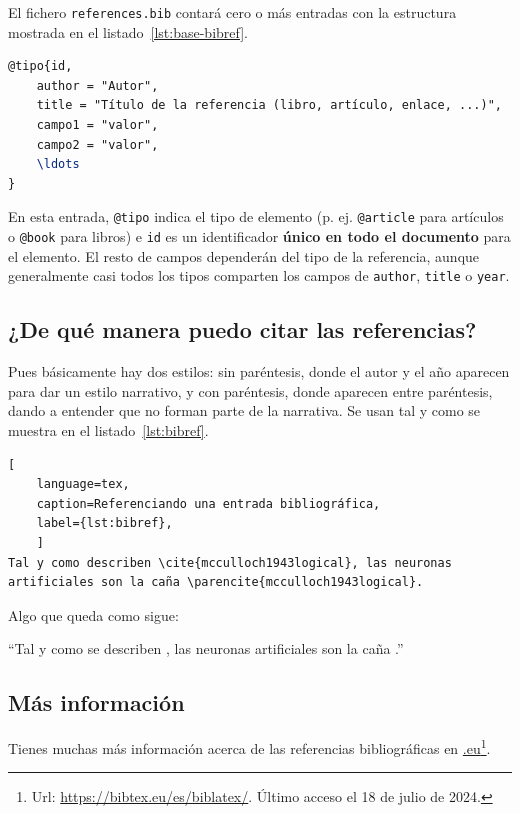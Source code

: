 \documentclass[%
    school=etsisi,%
    type=tfg,%
    degree=61CD,%
]{upm-report}
\begin{document}
El fichero \texttt{references.bib} contará cero o más entradas con la estructura mostrada en el listado~\ref{lst:base-bibref}.

\begin{lstlisting}[language=tex,caption=Estructura general de una referencia,label=lst:base-bibref]
@tipo{id,
    author = "Autor",
    title = "Título de la referencia (libro, artículo, enlace, ...)",
    campo1 = "valor",
    campo2 = "valor",
    \ldots
}
\end{lstlisting}

En esta entrada, \texttt{@tipo} indica el tipo de elemento (p. ej.
\texttt{@article} para artículos o \texttt{@book} para libros) e
\texttt{id} es un identificador \textbf{único en todo el documento} para
el elemento. El resto de campos dependerán del tipo de la referencia,
aunque generalmente casi todos los tipos comparten los campos de
\texttt{author}, \texttt{title} o \texttt{year}.

\subsection{¿De qué manera puedo citar las referencias?}

Pues básicamente hay dos estilos: sin paréntesis, donde el autor y el
año aparecen para dar un estilo narrativo, y con paréntesis, donde
aparecen entre paréntesis, dando a entender que no forman parte de la
narrativa. Se usan tal y como se muestra en el listado~\ref{lst:bibref}.

\begin{lstlisting}[
    language=tex,
    caption=Referenciando una entrada bibliográfica,
    label={lst:bibref},
    ]
Tal y como describen \cite{mcculloch1943logical}, las neuronas
artificiales son la caña \parencite{mcculloch1943logical}.
\end{lstlisting}

Algo que queda como sigue:

\enquote{Tal y como se describen \cite{mcculloch1943logical}, las
neuronas artificiales son la caña \parencite{mcculloch1943logical}.}

\subsection{Más información}

Tienes muchas más información acerca de las referencias bibliográficas
en \href{https://bibtex.eu/es/biblatex/}{.eu}\footnote{
Url: \url{https://bibtex.eu/es/biblatex/}. Último acceso el 18 de julio
de 2024.}.
\end{document}
